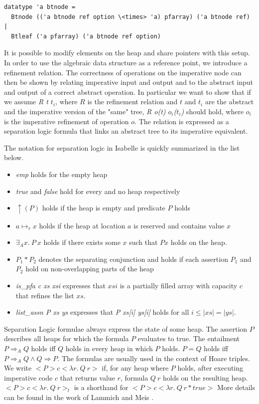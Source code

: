 \documentclass[a4paper,UKenglish,cleveref, cref, thm-restate]{lipics-v2021}
\begin{document}
\begin{lstlisting}[mathescape=true, language=Isabelle,label=lst:btree-imp-def]
datatype 'a btnode =
  Btnode (('a btnode ref option \<times> 'a) pfarray) ('a btnode ref) |
  Btleaf ('a pfarray) ('a btnode ref option)
\end{lstlisting}

It is possible to modify elements on the heap and share pointers with this setup.
In order to use the algebraic data structure as a reference point,
we introduce a refinement relation.
The correctness of operations on the imperative node
can then be shown by relating imperative input and output
and to the abstract input and output of a correct abstract operation.
In particular we want to show that if we assume \emph{R t $t_i$},
where $R$ is the refinement relation and $t$ and $t_i$ are the abstract
and the imperative version of the "same" tree,
\emph{R o(t) $o_i$($t_i$)} should hold, where $o_i$ is the imperative refinement
of operation $o$.
The relation is expressed as a separation logic formula that links an abstract tree to its
imperative equivalent.

The notation for separation logic in Isabelle is quickly summarized in the list below.
\begin{itemize}
    \item \textit{emp} holds for the empty heap
    \item \textit{true} and \textit{false} hold for every and no heap respectively
    \item $\uparrow(P)$ holds if the heap is empty and predicate $P$ holds
    \item $a \mapsto_r x$ holds if the heap at location $a$ is reserved and contains
    value $x$
    \item $\exists_A x.\ P\ x$ holds if there exists some $x$ such that $P x$
    holds on the heap.
    \item $P_1 * P_2$ denotes the separating conjunction and holds if each assertion $P_1$ and $P_2$ hold on non-overlapping parts
    of the heap
    \item \emph{is\_pfa c xs xsi} expresses that $xsi$ is a partially filled array
    with capacity $c$ that refines the list $xs$.
    \item \emph{list\_assn P xs ys} expresses that \emph{P xs[i] ys[i]} holds for all $i \leq |xs| = |ys|$.
\end{itemize}
Separation Logic formulae always express the state of some heap.
The assertion $P$ describes all heaps for which the formula $P$ evaluates to true.
The entailment $P \Longrightarrow_A Q$ holds iff $Q$ holds in every heap in which $P$ holds.
$P = Q$ holds iff $P \Longrightarrow_A Q \wedge Q \Longrightarrow P$.
The formulas are usually used in the context of Hoare triples.
We write $<P> c <\lambda r.\ Q\ r>$ if, for any heap where $P$ holds, after executing
imperative code $c$ that returns value $r$, formula $Q\ r$ holds on the resulting heap.
$<P> c <\lambda r.\ Q\ r>_t$ is a shorthand for $<P> c <\lambda r.\ Q\ r * \mathit{true}>$
More details can be found in the work of Lammich and Meis \cite{DBLP:journals/afp/LammichM12}.
\end{document}
